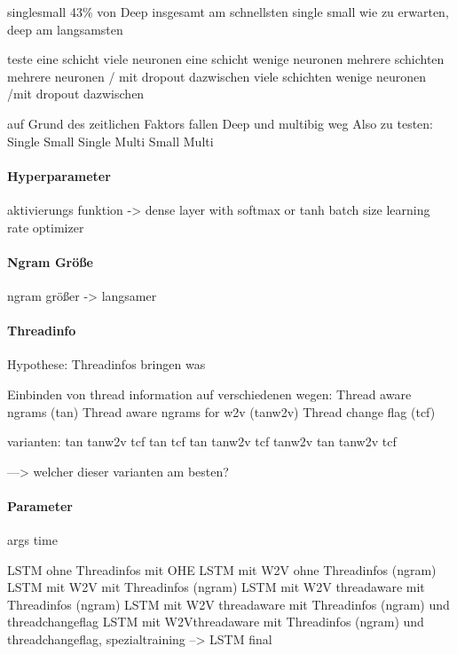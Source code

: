                 singlesmall 43\% von Deep
                insgesamt am schnellsten single small
                wie zu erwarten,  deep am langsamsten

                teste eine schicht viele neuronen 
                eine schicht wenige neuronen
                mehrere schichten mehrere neuronen / mit dropout dazwischen
                viele schichten wenige neuronen /mit dropout dazwischen

                auf Grund des zeitlichen Faktors fallen Deep und multibig weg
                Also zu testen:
                Single Small
                Single 
                Multi Small
                Multi 

            \paragraph{Hyperparameter}
                aktivierungs funktion
                -> dense layer with softmax or tanh
                batch size
                learning rate
                optimizer

            \paragraph{Ngram Größe}
                ngram größer -> langsamer

            \paragraph{Threadinfo}
                Hypothese:
                Threadinfos bringen was

                Einbinden von thread information auf verschiedenen wegen:
                Thread aware ngrams (tan)
                Thread aware ngrams for w2v (tanw2v)
                Thread change flag (tcf)

                varianten:
                tan
                tanw2v
                tcf
                tan tcf
                tan tanw2v
                tcf tanw2v
                tan tanw2v tcf

                ---> welcher dieser varianten am besten?

            \paragraph{Parameter}
                args
                time

                \ac{LSTM} ohne Threadinfos mit OHE
                LSTM mit W2V ohne Threadinfos (ngram)
                LSTM mit W2V mit Threadinfos (ngram)
                LSTM mit W2V threadaware mit Threadinfos (ngram)
                LSTM mit W2V threadaware mit Threadinfos (ngram) und threadchangeflag
                LSTM mit W2Vthreadaware mit Threadinfos (ngram) und threadchangeflag, spezialtraining
                --> LSTM final

